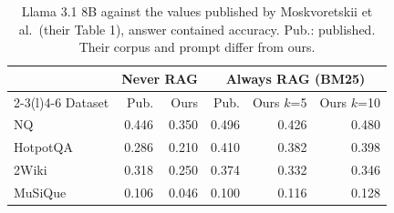 \begin{table}[t]
\centering\footnotesize
\setlength{\tabcolsep}{3pt}
\caption{Llama 3.1 8B against the values published by Moskvoretskii et al.\ (their Table 1), answer contained accuracy. Pub.: published. Their corpus and prompt differ from ours.}
\label{tab:p_sanity}
\begin{tabular*}{\linewidth}{@{\extracolsep{\fill}}lrrrrr@{}}
\toprule
 & \multicolumn{2}{c}{Never RAG} & \multicolumn{3}{c}{Always RAG (BM25)} \\
\cmidrule(lr){2-3}\cmidrule(l){4-6}
Dataset & Pub. & Ours & Pub. & Ours $k$=5 & Ours $k$=10 \\
\midrule
NQ & 0.446 & 0.350 & 0.496 & 0.426 & 0.480 \\
HotpotQA & 0.286 & 0.210 & 0.410 & 0.382 & 0.398 \\
2Wiki & 0.318 & 0.250 & 0.374 & 0.332 & 0.346 \\
MuSiQue & 0.106 & 0.046 & 0.100 & 0.116 & 0.128 \\
\bottomrule
\end{tabular*}
\end{table}
